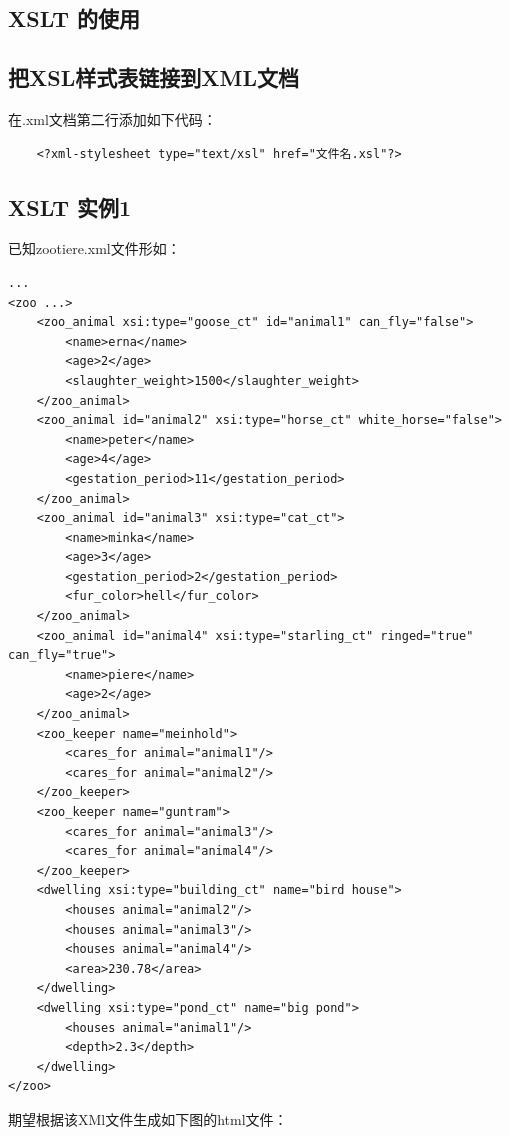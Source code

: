 \documentclass[fontset=windows]{article}
\begin{document}
\subsection{XSLT 的使用}

\subsection{把XSL样式表链接到XML文档}

在.xml文档第二行添加如下代码：

\begin{verbatim}
	<?xml-stylesheet type="text/xsl" href="文件名.xsl"?>
\end{verbatim}

\subsection{XSLT 实例1}

已知zootiere.xml文件形如：

\begin{verbatim}
...
<zoo ...>
	<zoo_animal xsi:type="goose_ct" id="animal1" can_fly="false">
		<name>erna</name>
		<age>2</age>
		<slaughter_weight>1500</slaughter_weight>
	</zoo_animal>
	<zoo_animal id="animal2" xsi:type="horse_ct" white_horse="false">
		<name>peter</name>
		<age>4</age>
		<gestation_period>11</gestation_period>
	</zoo_animal>
	<zoo_animal id="animal3" xsi:type="cat_ct">
		<name>minka</name>
		<age>3</age>
		<gestation_period>2</gestation_period>
		<fur_color>hell</fur_color>
	</zoo_animal>
	<zoo_animal id="animal4" xsi:type="starling_ct" ringed="true" can_fly="true">
		<name>piere</name>
		<age>2</age>
	</zoo_animal>
	<zoo_keeper name="meinhold">
		<cares_for animal="animal1"/>
		<cares_for animal="animal2"/>
	</zoo_keeper>
	<zoo_keeper name="guntram">
		<cares_for animal="animal3"/>
		<cares_for animal="animal4"/>
	</zoo_keeper>
	<dwelling xsi:type="building_ct" name="bird house">
		<houses animal="animal2"/>
		<houses animal="animal3"/>
		<houses animal="animal4"/>
		<area>230.78</area>
	</dwelling>
	<dwelling xsi:type="pond_ct" name="big pond">
		<houses animal="animal1"/>
		<depth>2.3</depth>
	</dwelling>
</zoo>
\end{verbatim}

期望根据该XMl文件生成如下图的html文件：
\end{document}

